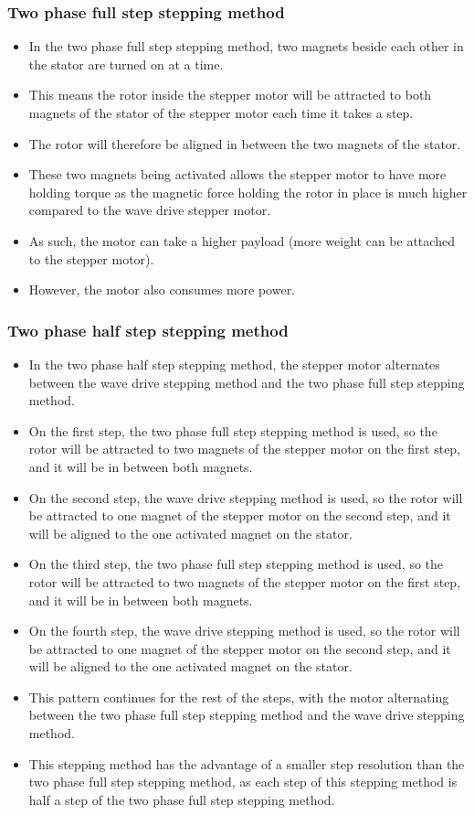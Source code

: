 \documentclass[11pt]{article}
\begin{document}
\subsubsection{Two phase full step stepping method}
\label{sec:org97d23b5}
\begin{itemize}
\item In the two phase full step stepping method, two magnets beside each other in the stator are turned on at a time.
\item This means the rotor inside the stepper motor will be attracted to both magnets of the stator of the stepper motor each time it takes a step.
\item The rotor will therefore be aligned in between the two magnets of the stator.
\item These two magnets being activated allows the stepper motor to have more holding torque as the magnetic force holding the rotor in place is much higher compared to the wave drive stepper motor.
\item As such, the motor can take a higher payload (more weight can be attached to the stepper motor).
\item However, the motor also consumes more power.
\end{itemize}

 \newpage
\subsubsection{Two phase half step stepping method}
\label{sec:org4ae4bea}
\begin{itemize}
\item In the two phase half step stepping method, the stepper motor alternates between the wave drive stepping method and the two phase full step stepping method.
\item On the first step, the two phase full step stepping method is used, so the rotor will be attracted to two magnets of the stepper motor on the first step, and it will be in between both magnets.
\item On the second step, the wave drive stepping method is used, so the rotor will be attracted to one magnet of the stepper motor on the second step, and it will be aligned to the one activated magnet on the stator.
\item On the third step, the two phase full step stepping method is used, so the rotor will be attracted to two magnets of the stepper motor on the first step, and it will be in between both magnets.
\item On the fourth step, the wave drive stepping method is used, so the rotor will be attracted to one magnet of the stepper motor on the second step, and it will be aligned to the one activated magnet on the stator.
\item This pattern continues for the rest of the steps, with the motor alternating between the two phase full step stepping method and the wave drive stepping method.
\item This stepping method has the advantage of a smaller step resolution than the two phase full step stepping method, as each step of this stepping method is half a step of the two phase full step stepping method.
\end{itemize}
\end{document}
